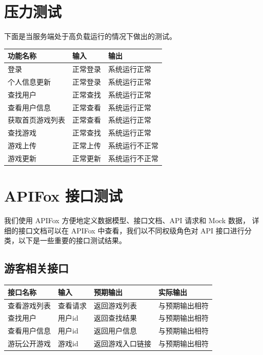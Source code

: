 \documentclass[12pt]{ctexart} %
\begin{document}
\section{压力测试}
下面是当服务端处于高负载运行的情况下做出的测试。

\begin{table}[H]
\centering
\renewcommand{\arraystretch}{1.5} 

\begin{tabular}{|>{\centering\arraybackslash}p{4cm}|>{\raggedright\arraybackslash}p{5cm}|>{\raggedright\arraybackslash}p{5cm}|}
\hline
\textbf{功能名称} & \textbf{输入} & \textbf{输出} \\
\hline
登录 & 正常登录 & 系统运行正常 \\
\hline
个人信息更新 & 正常登录 & 系统运行正常 \\
\hline
查找用户 & 正常查找 & 系统运行正常 \\
\hline
查看用户信息 & 正常查看 & 系统运行正常 \\
\hline
获取首页游戏列表 & 正常查看 & 系统运行正常 \\
\hline
查找游戏 & 正常查找 & 系统运行正常 \\
\hline
游戏上传 & 正常上传 & 系统运行不正常 \\
\hline
游戏更新 & 正常更新 & 系统运行不正常 \\
\hline
\end{tabular}
\end{table}

\section{APIFox 接口测试}

我们使用 APIFox 方便地定义数据模型、接口文档、API 请求和 Mock 数据，
详细的接口文档可以在 APIFox 中查看，我们以不同权级角色对 API 接口进行分类，以下是一些重要的接口测试结果。

\subsection{游客相关接口}
\begin{table}[H]
\centering
\renewcommand{\arraystretch}{1.5} 
\begin{tabular}{|>{\centering\arraybackslash}p{2cm}|>{\raggedright\arraybackslash}p{3cm}|>{\raggedright\arraybackslash}p{4.5cm}|>{\raggedright\arraybackslash}p{5cm}|}
\hline
\textbf{接口名称} & \textbf{输入} & \textbf{预期输出} & \textbf{实际输出} \\
\hline
查看游戏列表 & 查看请求 & 返回游戏列表 & 与预期输出相符 \\
\hline
查找用户 & 用户id & 返回查找结果 & 与预期输出相符 \\
\hline
查看用户信息 & 用户id & 返回用户信息 & 与预期输出相符 \\
\hline
游玩公开游戏 & 游戏id & 返回游戏入口链接 & 与预期输出相符 \\
\hline
\end{tabular}
\end{table}
\end{document}
